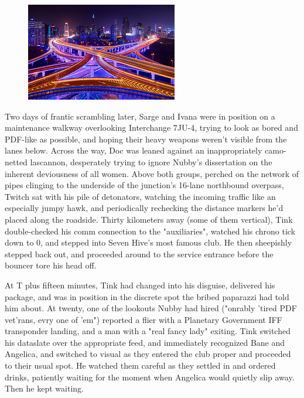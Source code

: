 \begin{figure}
	\begin{center}
		\includegraphics[width=\figwidth]{pics/19/34.png}
	\end{center}
\end{figure}
Two days of frantic scrambling later, Sarge and Ivana were in position on a maintenance walkway overlooking Interchange 7JU-4, trying to look as bored and PDF-like as possible, and hoping their heavy weapons weren't visible from the lanes below. 
Across the way, Doc was leaned against an inappropriately camo-netted lascannon, desperately trying to ignore Nubby's dissertation on the inherent deviousness of all women. 
Above both groups, perched on the network of pipes clinging to the underside of the junction's 16-lane northbound overpass, Twitch sat with his pile of detonators, watching the incoming traffic like an especially jumpy hawk, and periodically rechecking the distance markers he'd placed along the roadside. 
Thirty kilometers away (some of them vertical), Tink double-checked his comm connection to the "auxiliaries", watched his chrono tick down to 0, and stepped into Seven Hive's most famous club. 
He then sheepishly stepped back out, and proceeded around to the service entrance before the bouncer tore his head off.

At T plus fifteen minutes, Tink had changed into his disguise, delivered his package, and was in position in the discrete spot the bribed paparazzi had told him about. 
At twenty, one of the lookouts Nubby had hired ("onrably 'tired PDF vet'rans, evry one of 'em") reported a flier with a Planetary Government IFF transponder landing, and a man with a "real fancy lady" exiting. 
Tink switched his dataslate over the appropriate feed, and immediately recognized Bane and Angelica, and switched to visual as they entered the club proper and proceeded to their usual spot. 
He watched them careful as they settled in and ordered drinks, patiently waiting for the moment when Angelica would quietly slip away. 
Then he kept waiting.

